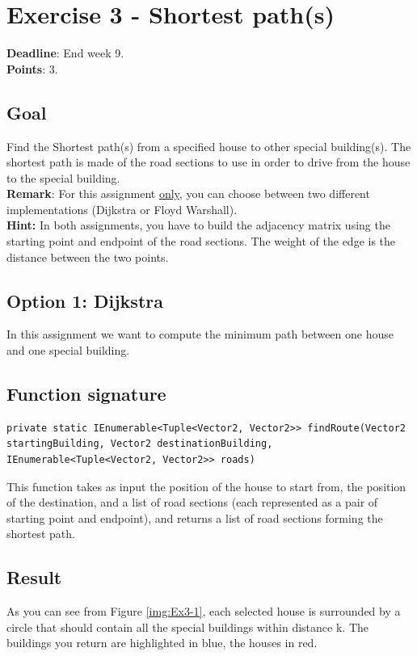 \documentclass[10pt,a4paper]{article}
\begin{document}
\section*{Exercise 3 - Shortest path(s)}
\textbf{Deadline}: End week 9. \\
\textbf{Points}: 3.


\subsection*{Goal}
Find the Shortest path(s) from a specified house to other special building(s). The shortest path is made of the road sections to use in order to drive from the house to the special building.\\
\textbf{Remark}: For this assignment \underline{only}, you can choose between two different implementations (Dijkstra or Floyd Warshall).\\

\noindent
\textbf{Hint:} In both assignments, you have to build the adjacency matrix using the starting point and endpoint of the road sections. The weight of the edge is the distance between the two points.

\subsection*{Option 1: Dijkstra}
In this assignment we want to compute the minimum path between one house and one special building. 

\subsection*{Function signature} 
\begin{lstlisting}
private static IEnumerable<Tuple<Vector2, Vector2>> findRoute(Vector2 startingBuilding, Vector2 destinationBuilding, IEnumerable<Tuple<Vector2, Vector2>> roads)
\end{lstlisting}

\noindent
This function takes as input the position of the house to start from, the position of the destination, and a list of road sections (each represented as a pair of starting point and endpoint), and returns a list of road sections forming the shortest path.

\subsection*{Result}
As you can see from Figure \ref{img:Ex3-1}, each selected house is surrounded by a circle that should contain all the special buildings within distance k. The buildings you return are highlighted in blue, the houses in red.
\end{document}
